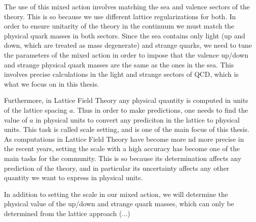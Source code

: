 The use of this mixed action involves matching the sea and valence sectors of the theory. This is so because we use different lattice regularizations for both. In order to ensure unitarity of the theory in the continuum we must match the physical quark masses in both sectors. Since the sea contains only light (up and down, which are treated as mass degenerate) and strange quarks, we need to tune the parameters of the mixed action in order to impose that the valence up/down and strange physical quark masses are the same as the ones in the sea. This involves precise calculations in the light and strange sectors of QCD, which is what we focus on in this thesis.

Furthermore, in Lattice Field Theory any physical quantity is computed in units of the lattice spacing $a$. Thus in order to make predictions, one needs to find the value of $a$ in physical units to convert any prediciton in the lattice to physical units. This task is called scale setting, and is one of the main focus of this thesis. As computations in Lattice Field Theory have become more nd more precise in the recent years, setting the scale with a high accuracy has become one of the main tasks for the community. This is so because its determination affects any prediction of the theory, and in particular its uncertainty affects any other quantity we want to express in physical units.

In addition to setting the scale in our mixed action, we will determine the physical value of the up/down and strange quark masses, which can only be determined from the lattice approach (...)


